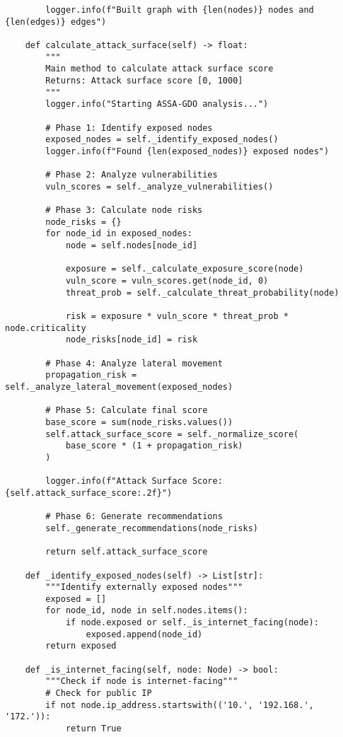 \begin{verbatim}
        logger.info(f"Built graph with {len(nodes)} nodes and {len(edges)} edges")
    
    def calculate_attack_surface(self) -> float:
        """
        Main method to calculate attack surface score
        Returns: Attack surface score [0, 1000]
        """
        logger.info("Starting ASSA-GDO analysis...")
        
        # Phase 1: Identify exposed nodes
        exposed_nodes = self._identify_exposed_nodes()
        logger.info(f"Found {len(exposed_nodes)} exposed nodes")
        
        # Phase 2: Analyze vulnerabilities
        vuln_scores = self._analyze_vulnerabilities()
        
        # Phase 3: Calculate node risks
        node_risks = {}
        for node_id in exposed_nodes:
            node = self.nodes[node_id]
            
            exposure = self._calculate_exposure_score(node)
            vuln_score = vuln_scores.get(node_id, 0)
            threat_prob = self._calculate_threat_probability(node)
            
            risk = exposure * vuln_score * threat_prob * node.criticality
            node_risks[node_id] = risk
        
        # Phase 4: Analyze lateral movement
        propagation_risk = self._analyze_lateral_movement(exposed_nodes)
        
        # Phase 5: Calculate final score
        base_score = sum(node_risks.values())
        self.attack_surface_score = self._normalize_score(
            base_score * (1 + propagation_risk)
        )
        
        logger.info(f"Attack Surface Score: {self.attack_surface_score:.2f}")
        
        # Phase 6: Generate recommendations
        self._generate_recommendations(node_risks)
        
        return self.attack_surface_score
    
    def _identify_exposed_nodes(self) -> List[str]:
        """Identify externally exposed nodes"""
        exposed = []
        for node_id, node in self.nodes.items():
            if node.exposed or self._is_internet_facing(node):
                exposed.append(node_id)
        return exposed
    
    def _is_internet_facing(self, node: Node) -> bool:
        """Check if node is internet-facing"""
        # Check for public IP
        if not node.ip_address.startswith(('10.', '192.168.', '172.')):
            return True
        

\end{verbatim}
